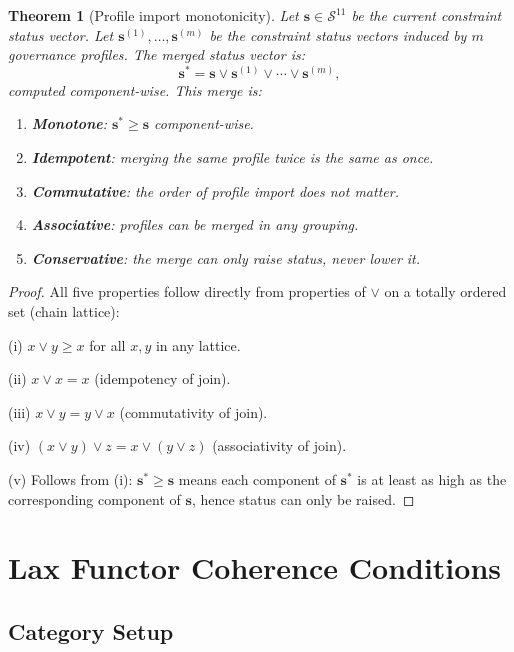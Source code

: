 \documentclass[11pt,letterpaper]{article}
\theoremstyle{pirtmthm}
\newtheorem{theorem}{Theorem}[section]
\theoremstyle{remark}
\begin{document}
\begin{theorem}[Profile import monotonicity]
\label{thm:A-monotone}
Let $\mathbf{s} \in \mathcal{S}^{11}$ be the current constraint status
vector. Let $\mathbf{s}^{(1)}, \ldots, \mathbf{s}^{(m)}$ be the constraint
status vectors induced by $m$ governance profiles.
The merged status vector is:
\[
  \mathbf{s}^* = \mathbf{s} \vee \mathbf{s}^{(1)} \vee \cdots \vee \mathbf{s}^{(m)},
\]
computed component-wise. This merge is:
\begin{enumerate}[label=(\roman*)]
  \item \textbf{Monotone}: $\mathbf{s}^* \geq \mathbf{s}$ component-wise.
  \item \textbf{Idempotent}: merging the same profile twice is the same
    as once.
  \item \textbf{Commutative}: the order of profile import does not matter.
  \item \textbf{Associative}: profiles can be merged in any grouping.
  \item \textbf{Conservative}: the merge can only raise status, never
    lower it.
\end{enumerate}
\end{theorem}

\begin{proof}
All five properties follow directly from properties of $\vee$ on a
totally ordered set (chain lattice):

(i) $x \vee y \geq x$ for all $x, y$ in any lattice.

(ii) $x \vee x = x$ (idempotency of join).

(iii) $x \vee y = y \vee x$ (commutativity of join).

(iv) $(x \vee y) \vee z = x \vee (y \vee z)$ (associativity of join).

(v) Follows from (i): $\mathbf{s}^* \geq \mathbf{s}$ means each component
of $\mathbf{s}^*$ is at least as high as the corresponding component
of $\mathbf{s}$, hence status can only be raised.
\end{proof}

\section{Lax Functor Coherence Conditions}
\label{sec:functor}

\subsection{Category Setup}
\end{document}
